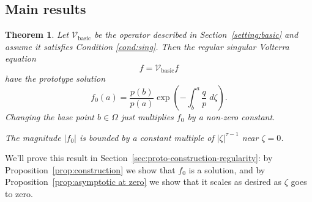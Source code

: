 \documentclass{article}
\newtheorem{defn}{Definition}
\theoremstyle{plain}
\newtheorem{thm}{Theorem}
\newcommand{\hardpart}{\mathcal{V}_\text{basic}}
\newcommand{\domain}{\Omega}
\begin{document}
\subsection{Main results}\label{sec:results}
\begin{thm}\label{thm:basic_volterra}
Let $\hardpart$ be the operator described in Section~\ref{setting:basic} and assume it satisfies {\em Condition \eqref{cond:sing}}. Then the regular singular Volterra equation
\[ f = \hardpart f \]
have the {\em prototype solution}
\begin{equation}\label{eqn:test_solution}
f_0(a)=\frac{p(b)}{p(a)} \exp\left(-\int_{b}^{a}\frac{q}{p}\;d\zeta\right).
\end{equation}
Changing the base point $b \in \domain$ just multiplies $f_0$ by a non-zero constant.

The magnitude $|f_0|$ is bounded by a constant multiple of $|\zeta|^{\tau-1}$ near $\zeta = 0$.

\end{thm}
We'll prove this result in Section~\ref{sec:proto-construction-regularity}: by Proposition~\ref{prop:construction} we show that $f_0$ is a solution, and by Proposition~\ref{prop:asymptotic at zero} we show that it scales as desired as $\zeta$ goes to zero.
\end{document}
